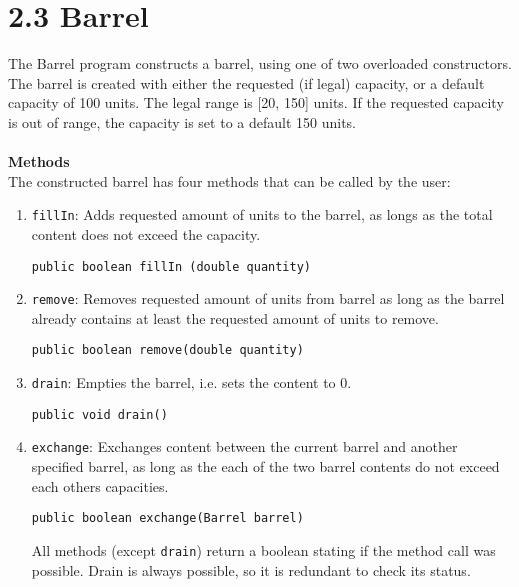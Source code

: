 \section*{2.3 Barrel}

The Barrel program constructs a barrel, using one of two overloaded constructors. The barrel is created with either the requested (if legal) capacity, or a default capacity of 100 units. The legal range is [20, 150] units. If the requested capacity is out of range, the capacity is set to a default 150 units. \\
\\
\textbf{Methods}\\
The constructed barrel has four methods that can be called by the user:
\begin{enumerate}
    \item \texttt{fillIn}: Adds requested amount of units to the barrel, as longs as the total content does not exceed the capacity. 
    
\begin{lstlisting}
public boolean fillIn (double quantity)
\end{lstlisting}
    
    
    \item \texttt{remove}: Removes requested amount of units from barrel as long as the barrel already contains at least the requested amount of units to remove. 
    
\begin{lstlisting}
public boolean remove(double quantity)
\end{lstlisting}
    
    \item \texttt{drain}: Empties the barrel, i.e. sets the content to 0.

\begin{lstlisting}
public void drain()
\end{lstlisting}
    
    \item \texttt{exchange}: Exchanges content between the current barrel and another specified barrel, as long as the each of the two barrel contents do not exceed each others capacities. 
    
\begin{lstlisting}
public boolean exchange(Barrel barrel)
\end{lstlisting}
    
    All methods (except \texttt{drain}) return a boolean stating if the method call was possible. Drain is always possible, so it is redundant to check its status. 
\end{enumerate}